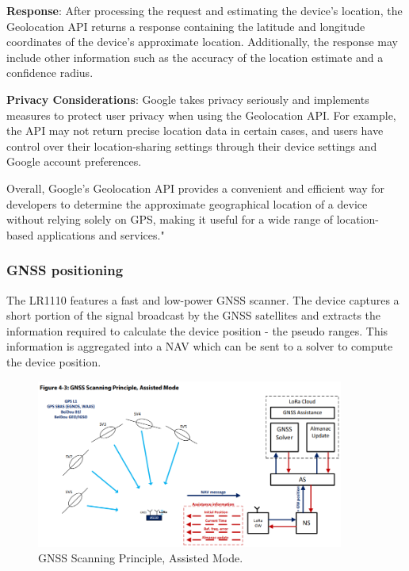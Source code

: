 \textbf{Response}: After processing the request and estimating the device's location, the Geolocation API returns a response containing the latitude and longitude coordinates of the device's approximate location. Additionally, the response may include other information such as the accuracy of the location estimate and a confidence radius.

\textbf{Privacy Considerations}: Google takes privacy seriously and implements measures to protect user privacy when using the Geolocation API. For example, the \ac{API} may not return precise location data in certain cases, and users have control over their location-sharing settings through their device settings and Google account preferences.

Overall, Google's Geolocation API provides a convenient and efficient way for developers to determine the approximate geographical location of a device without relying solely on \ac{GPS}, making it useful for a wide range of location-based applications and services."


\subsubsection{GNSS positioning}

The LR1110 features a fast and low-power \ac{GNSS} scanner. The device captures a short portion of the signal broadcast by the
\ac{GNSS} satellites and extracts the information required to calculate the device position - the pseudo ranges. This information is aggregated into a \ac{NAV} which can be sent to a solver to compute the device position.

\begin{figure}[H]
    \centering
    \includegraphics[width=0.9\textwidth]{figures/GNSS_scanning.png}
    \caption{GNSS Scanning Principle, Assisted Mode.}
    \label{fig:gnss_scanning}
\end{figure}

